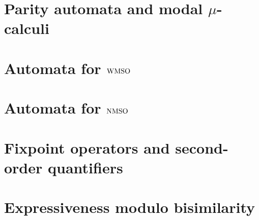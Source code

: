\documentclass[prodmode,acmtecs]{acmsmall} %
\begin{document}
\clearpage

%

\section{Parity automata and modal $\mu$-calculi}\label{sec:parityaut}


\clearpage

\section{Automata for $\mathrm{WMSO}$}\label{sec:autwmso}

\clearpage

\section{Automata for $\mathrm{NMSO}$}\label{sec:autnmso}

\clearpage

\section{Fixpoint operators and second-order quantifiers}


\clearpage

\clearpage

\section{Expressiveness modulo bisimilarity}\label{sec:expresso}






\end{document}
